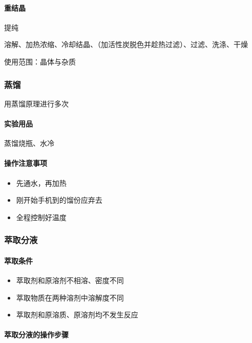 \documentclass[10pt]{article}
\begin{document}
	\paragraph{重结晶}
	
	提纯
	
	溶解、加热浓缩、冷却结晶、（加活性炭脱色并趁热过滤）、过滤、洗涤、干燥
	
	使用范围：晶体与杂质
	
	\subsubsection{蒸馏}
	
	用蒸馏原理进行多次
	
	\paragraph{实验用品}
	
	蒸馏烧瓶、水冷
	
	\paragraph{操作注意事项}
	
	\begin{itemize}
		\item 先通水，再加热
		\item 刚开始手机到的馏份应弃去
		\item 全程控制好温度
	\end{itemize}
	
	\subsubsection{萃取分液}
	
	\paragraph{萃取条件}
	
	\begin{itemize}
		\item 萃取剂和原溶剂不相溶、密度不同
		\item 萃取物质在两种溶剂中溶解度不同
		\item 萃取剂和原溶质、原溶剂均不发生反应
	\end{itemize}
	
	\paragraph{萃取分液的操作步骤}
	
\end{document}
